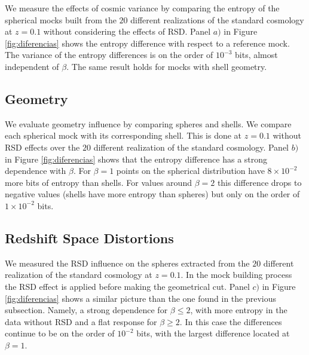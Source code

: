 \documentclass[fleqn,usenatbib]{mnras}
\begin{document}
We measure the effects of cosmic variance by comparing the entropy of the spherical 
mocks built from the $20$ different realizations of the standard cosmology at $z=0.1$ without considering the effects of RSD. 
Panel $a)$ in Figure \ref{fig:diferencias} shows the entropy difference with respect to a reference mock.
The variance of the entropy differences is on the order of $10^{-3}$ bits, almost 
independent of $\beta$.
The same result holds for mocks with shell geometry.



\subsection{Geometry}

We evaluate geometry influence by comparing spheres and shells.
We compare each spherical mock with its corresponding shell.
This is done at $z=0.1$ without RSD effects over the $20$ different realization 
of the standard cosmology.
Panel $b)$ in Figure \ref{fig:diferencias} shows that the entropy difference has a strong dependence with $\beta$. 
For $\beta=1$ points on the spherical distribution have $8\times 10^{-2}$ more bits of entropy than shells.
For values around $\beta=2$ this difference drops to negative values (shells have more entropy than spheres) but only on the order of $1\times10^{-2}$ bits.




\subsection{Redshift Space Distortions}

We measured the RSD influence on the spheres extracted from the $20$ different realization of the standard cosmology at $z=0.1$.
In the mock building process the RSD effect is applied before making the geometrical cut.
Panel $c)$ in Figure \ref{fig:diferencias} shows a similar picture than the one found in the previous subsection.
Namely, a strong dependence for $\beta\leq 2$, with more entropy in the data without RSD and a flat response for $\beta\geq 2$.
In this case the differences continue to be on the order of $10^{-2}$ bits, with the
largest difference located at $\beta=1$.
\end{document}
